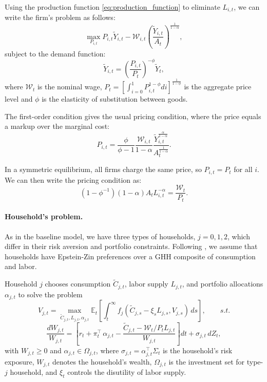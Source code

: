 Using the production function \eqref{eq:production_function} to eliminate $L_{i,t}$, we can write the firm's problem as follows:
\begin{equation}
    \max_{P_{i,t}} P_{i,t} \tilde{Y}_{i,t} - \mathcal{W}_{i,t} \left(\frac{\tilde{Y}_{i,t}}{A_t}\right)^{\frac{1}{1-\alpha}},
\end{equation}
subject to the demand function:
\begin{equation}\label{eq:demand_function}
    \tilde{Y}_{i,t} = \left( \frac{P_{i,t}}{P_t} \right)^{-\phi} \tilde{Y}_t,
\end{equation}
where $\mathcal{W}_t$ is the nominal wage, $P_t = \left[ \int_{i=0}^1 P_{i,t}^{1-\phi} di \right]^{\frac{1}{1-\phi}}$ is the aggregate price level and $\phi$ is the elasticity of substitution between goods.

The first-order condition gives the usual pricing condition, where the price equals a markup over the marginal cost:
\begin{equation}
    P_{i,t} = \frac{\phi}{\phi-1} \frac{\mathcal{W}_{i,t}}{1-\alpha} \frac{\tilde{Y}_{i,t}^{\frac{\alpha}{1-\alpha}}}{A_t^{\frac{1}{1-\alpha}}}.
\end{equation}

In a symmetric equilibrium, all firms charge the same price, so $P_{i,t} = P_t$ for all $i$. 
We can then write the pricing condition as:     
\begin{equation}
    (1-\phi^{-1})(1-\alpha) A_t L_{i,t}^{-\alpha} = \frac{\mathcal{W}_t}{P_t}.
\end{equation}

\paragraph{Household's problem.} 
As in the baseline model, we have three types of households, $j = 0,1,2$, which differ in their risk aversion and portfolio constraints.
Following \citet{BigioSilvaZilberman2025}, we assume that households have Epstein-Zin preferences over a GHH composite of consumption and labor. 

Household $j$ chooses consumption $\tilde{C}_{j,t}$, labor supply $L_{j,t}$, and portfolio allocations $\alpha_{j,t}$ to solve the problem
\begin{equation}\label{eq:inv-problem-appendix}
    V_{j,t} = \max_{\tilde{C}_{j,t},L_{j,t},\alpha_{j,t}} 
    \mathbb{E}_t \left[ \int_t^\infty f_j(\tilde{C}_{j,s}- \xi_s L_{j,s},V_{j,s})\, ds \right], \qquad s.t.
\end{equation}
\begin{equation}\label{eq:budget_constraint-appendix}
    \frac{d W_{j,t}}{W_{j,t}} = \left[r_t + \pi_{t}^\top \,\alpha_{j,t}  - \frac{\tilde{C}_{j,t} - \mathcal{W}_t / P_t L_{j,t}}{W_{j,t}}\right] dt 
    + \sigma_{j,t}\, dZ_t,
\end{equation}
with $W_{j,t} \geq 0$ and $\alpha_{j,t} \in \Omega_{j,t}$,
where $\sigma_{j,t} = \alpha_{j,t}^ \top \Sigma_{t}$ is the household's risk exposure,
$W_{j,t}$ denotes the household's wealth, $\Omega_{j,t}$ is the investment set for type-$j$ household, and $\xi_t$ controls the disutility of labor supply.

